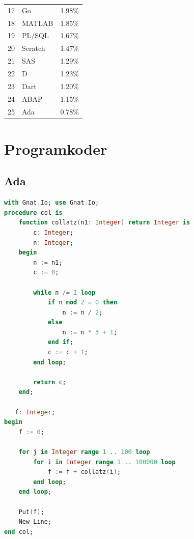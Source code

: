 \documentclass[12pt,swedish]{article}
\begin{document}
\begin{appendices}
\begin{table}[H]
\begin{tabular}{lll}
17        & Go                   & 1.98\%      \\
18        & MATLAB               & 1.85\%      \\
19        & PL/SQL               & 1.67\%      \\
20        & Scratch              & 1.47\%      \\
21        & SAS                  & 1.29\%      \\
22        & D                    & 1.23\%      \\
23        & Dart                 & 1.20\%      \\
24        & ABAP                 & 1.15\%      \\
25        & Ada                  & 0.78\%      \\ \bottomrule
\end{tabular}
\end{table}

\clearpage

\section{Programkoder}\label{appendix:programcodes}


\subsection{Ada}
\begin{lstlisting}[language=ada]
with Gnat.Io; use Gnat.Io;
procedure col is
    function collatz(n1: Integer) return Integer is
        c: Integer;
        n: Integer;
    begin
        n := n1;
        c := 0;

        while n /= 1 loop
            if n mod 2 = 0 then
                n := n / 2;
            else
                n := n * 3 + 1;
            end if;
            c := c + 1;
        end loop;

        return c;
    end;

   f: Integer;
begin
    f := 0;

    for j in Integer range 1 .. 100 loop
        for i in Integer range 1 .. 100000 loop
            f := f + collatz(i);
        end loop;
    end loop;

    Put(f);
    New_Line;
end col;
\end{lstlisting}



\end{appendices}
\end{document}
